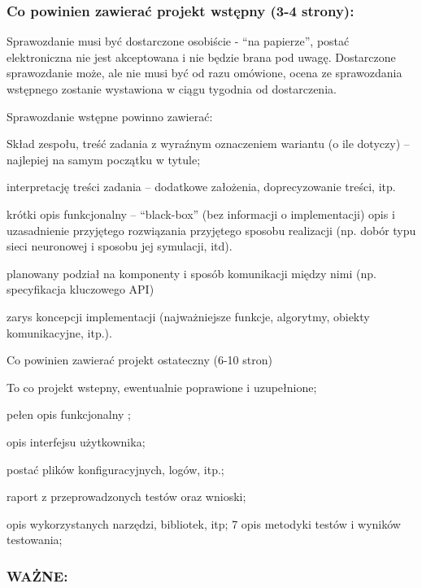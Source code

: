\subsubsection*{Co powinien zawierać projekt wstępny (3-\/4 strony)\+:}

Sprawozdanie musi być dostarczone osobiście -\/ “na papierze”, postać elektroniczna nie jest akceptowana i nie będzie brana pod uwagę. Dostarczone sprawozdanie może, ale nie musi być od razu omówione, ocena ze sprawozdania wstępnego zostanie wystawiona w ciągu tygodnia od dostarczenia.

Sprawozdanie wstępne powinno zawierać\+:
\begin{DoxyEnumerate}
\item Skład zespołu, treść zadania z wyraźnym oznaczeniem wariantu (o ile dotyczy) – najlepiej na samym początku w tytule;
\item interpretację treści zadania – dodatkowe założenia, doprecyzowanie treści, itp.
\item krótki opis funkcjonalny – “black-\/box” (bez informacji o implementacji) opis i uzasadnienie przyjętego rozwiązania przyjętego sposobu realizacji (np. dobór typu sieci neuronowej i sposobu jej symulacji, itd).
\item planowany podział na komponenty i sposób komunikacji między nimi (np. specyfikacja kluczowego A\+PI)
\item zarys koncepcji implementacji (najważniejsze funkcje, algorytmy, obiekty komunikacyjne, itp.).
\end{DoxyEnumerate}

Co powinien zawierać projekt ostateczny (6-\/10 stron)
\begin{DoxyEnumerate}
\item To co projekt wstepny, ewentualnie poprawione i uzupełnione;
\item pełen opis funkcjonalny ;
\item opis interfejsu użytkownika;
\item postać plików konfiguracyjnych, logów, itp.;
\item raport z przeprowadzonych testów oraz wnioski;
\item opis wykorzystanych narzędzi, bibliotek, itp; 7 opis metodyki testów i wyników testowania;
\end{DoxyEnumerate}

\subsubsection*{W\+AŻ\+NE\+:}

